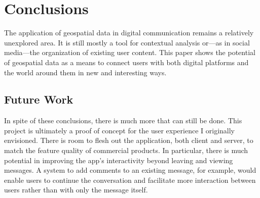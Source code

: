 \section{Conclusions}

The application of geospatial data in digital communication remains a relatively unexplored area. It is still mostly a tool for contextual analysis or—as in social media—the organization of existing user content. This paper shows the potential of geospatial data as a means to connect users with both digital platforms and the world around them in new and interesting ways.

\subsection{Future Work}

In spite of these conclusions, there is much more that can still be done. This project is ultimately a proof of concept for the user experience I originally envisioned. There is room to flesh out the application, both client and server, to match the feature quality of commercial products. In particular, there is much potential in improving the app's interactivity beyond leaving and viewing messages. A system to add comments to an existing message, for example, would enable users to continue the conversation and facilitate more interaction between users rather than with only the message itself.
